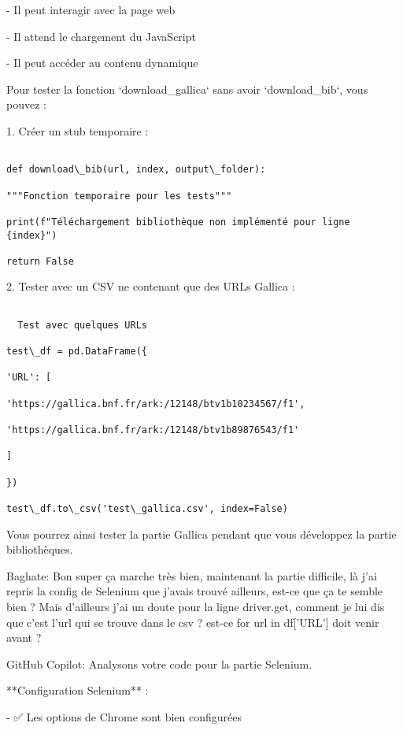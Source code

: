 - Il peut interagir avec la page web

- Il attend le chargement du JavaScript

- Il peut accéder au contenu dynamique

Pour tester la fonction `download\_gallica` sans avoir `download\_bib`, vous pouvez :

1. Créer un stub temporaire :

\begin{verbatim}

def download\_bib(url, index, output\_folder):

"""Fonction temporaire pour les tests"""

print(f"Téléchargement bibliothèque non implémenté pour ligne {index}")

return False

\end{verbatim}

2. Tester avec un CSV ne contenant que des URLs Gallica :

\begin{verbatim}

  Test avec quelques URLs

test\_df = pd.DataFrame({

'URL': [

'https://gallica.bnf.fr/ark:/12148/btv1b10234567/f1',

'https://gallica.bnf.fr/ark:/12148/btv1b89876543/f1'

]

})

test\_df.to\_csv('test\_gallica.csv', index=False)

\end{verbatim}

Vous pourrez ainsi tester la partie Gallica pendant que vous développez la partie bibliothèques.

Baghate: Bon super ça marche très bien, maintenant la partie difficile,  là j'ai repris la config de Selenium que j'avais trouvé ailleurs, est-ce que ça te semble bien ? Mais d'ailleurs j'ai un doute pour la ligne driver.get, comment je lui dis que c'est l'url qui se trouve dans le csv ? est-ce for url in df['URL'] doit venir avant ?

GitHub Copilot: Analysons votre code pour la partie Selenium.

**Configuration Selenium** :

- ✅ Les options de Chrome sont bien configurées

